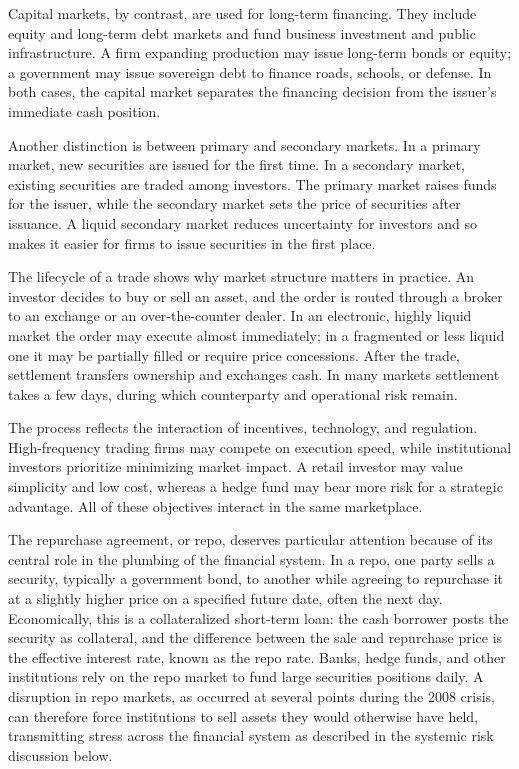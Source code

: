 \documentclass[../ai_in_finance]{subfiles}
\begin{document}
Capital markets, by contrast, are used for long-term financing. They include equity and long-term debt markets and fund business investment and public infrastructure. A firm expanding production may issue long-term bonds or equity; a government may issue sovereign debt to finance roads, schools, or defense. In both cases, the capital market separates the financing decision from the issuer's immediate cash position.

Another distinction is between primary and secondary markets. In a primary market, new securities are issued for the first time. In a secondary market, existing securities are traded among investors. The primary market raises funds for the issuer, while the secondary market sets the price of securities after issuance. A liquid secondary market reduces uncertainty for investors and so makes it easier for firms to issue securities in the first place.

The lifecycle of a trade shows why market structure matters in practice. An investor decides to buy or sell an asset, and the order is routed through a broker to an exchange or an over-the-counter dealer. In an electronic, highly liquid market the order may execute almost immediately; in a fragmented or less liquid one it may be partially filled or require price concessions. After the trade, settlement transfers ownership and exchanges cash. In many markets settlement takes a few days, during which counterparty and operational risk remain.

The process reflects the interaction of incentives, technology, and regulation. High-frequency trading firms may compete on execution speed, while institutional investors prioritize minimizing market impact. A retail investor may value simplicity and low cost, whereas a hedge fund may bear more risk for a strategic advantage. All of these objectives interact in the same marketplace.

The repurchase agreement, or repo, deserves particular attention because of its central role in the plumbing of the financial system. In a repo, one party sells a security, typically a government bond, to another while agreeing to repurchase it at a slightly higher price on a specified future date, often the next day. Economically, this is a collateralized short-term loan: the cash borrower posts the security as collateral, and the difference between the sale and repurchase price is the effective interest rate, known as the repo rate.
Banks, hedge funds, and other institutions rely on the repo market to fund large securities positions daily. A disruption in repo markets, as occurred at several points during the 2008 crisis, can therefore force institutions to sell assets they would otherwise have held, transmitting stress across the financial system as described in the systemic risk discussion below.
\end{document}
